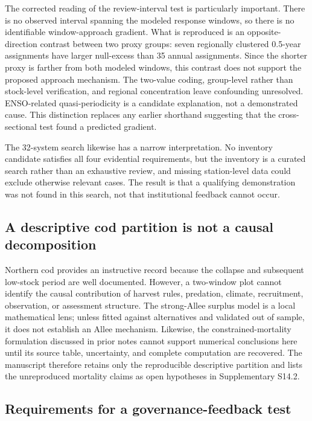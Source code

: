 The corrected reading of the review-interval test is particularly important. There is no observed interval spanning the modeled response windows, so there is no identifiable window-approach gradient. What is reproduced is an opposite-direction contrast between two proxy groups: seven regionally clustered 0.5-year assignments have larger null-excess than 35 annual assignments. Since the shorter proxy is farther from both modeled windows, this contrast does not support the proposed approach mechanism. The two-value coding, group-level rather than stock-level verification, and regional concentration leave confounding unresolved. ENSO-related quasi-periodicity is a candidate explanation, not a demonstrated cause. This distinction replaces any earlier shorthand suggesting that the cross-sectional test found a predicted gradient.

The 32-system search likewise has a narrow interpretation. No inventory candidate satisfies all four evidential requirements, but the inventory is a curated search rather than an exhaustive review, and missing station-level data could exclude otherwise relevant cases. The result is that a qualifying demonstration was not found in this search, not that institutional feedback cannot occur.

\subsection{A descriptive cod partition is not a causal decomposition}

Northern cod provides an instructive record because the collapse and subsequent low-stock period are well documented. However, a two-window plot cannot identify the causal contribution of harvest rules, predation, climate, recruitment, observation, or assessment structure. The strong-Allee surplus model is a local mathematical lens; unless fitted against alternatives and validated out of sample, it does not establish an Allee mechanism. Likewise, the constrained-mortality formulation discussed in prior notes cannot support numerical conclusions here until its source table, uncertainty, and complete computation are recovered. The manuscript therefore retains only the reproducible descriptive partition and lists the unreproduced mortality claims as open hypotheses in Supplementary S14.2.

\subsection{Requirements for a governance-feedback test}

